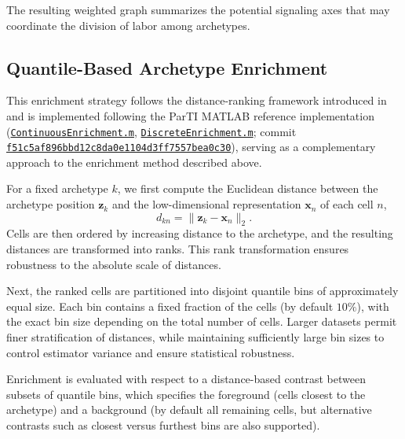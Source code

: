 \documentclass[oneside]{article}
\begin{document}
The resulting weighted graph summarizes the potential signaling axes that may coordinate the division of labor among archetypes.

\subsection{Quantile-Based Archetype Enrichment}

This enrichment strategy follows the distance-ranking framework introduced in \autocite{10.1016/j.cels.2018.12.008,Korem2015,Hart2015} and is implemented following the ParTI MATLAB reference implementation (\href{https://github.com/AlonLabWIS/ParTI/blob/f51c5af896bbd12c8da0e1104d3ff7557bea0c30/ContinuousEnrichment.m}{\texttt{ContinuousEnrichment.m}}, \href{https://github.com/AlonLabWIS/ParTI/blob/f51c5af896bbd12c8da0e1104d3ff7557bea0c30/DiscreteEnrichment.m}{\texttt{DiscreteEnrichment.m}}; commit \href{https://github.com/AlonLabWIS/ParTI/tree/f51c5af896bbd12c8da0e1104d3ff7557bea0c30}{\texttt{f51c5af896bbd12c8da0e1104d3ff7557bea0c30}}), serving as a complementary approach to the enrichment method described above.

For a fixed archetype $k$, we first compute the Euclidean distance between the archetype position $\mathbf{z}_k$ and the low-dimensional representation $\mathbf{x}_n$ of each cell $n$,
\begin{equation}
    d_{kn} = \lVert \mathbf{z}_k - \mathbf{x}_n \rVert_2 .
\end{equation}
Cells are then ordered by increasing distance to the archetype, and the resulting distances are transformed into ranks. This rank transformation ensures robustness to the absolute scale of distances.

Next, the ranked cells are partitioned into disjoint quantile bins of approximately equal size. Each bin contains a fixed fraction of the cells (by default $10\%$), with the exact bin size depending on the total number of cells. Larger datasets permit finer stratification of distances, while maintaining sufficiently large bin sizes to control estimator variance and ensure statistical robustness.

Enrichment is evaluated with respect to a distance-based contrast between subsets of quantile bins, which specifies the foreground (cells closest to the archetype) and a background (by default all remaining cells, but alternative contrasts such as closest versus furthest bins are also supported).
\end{document}
